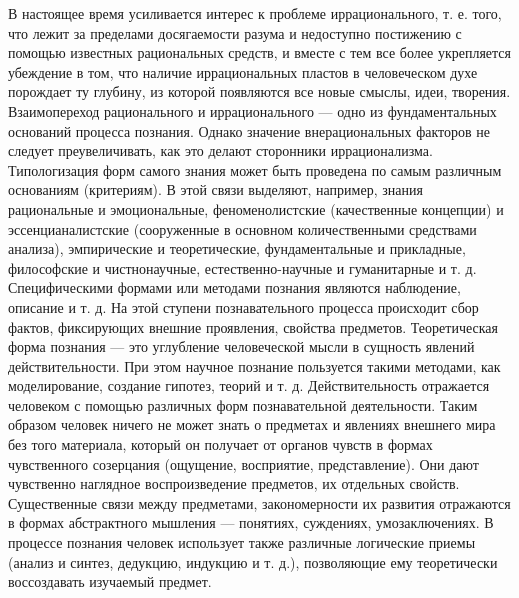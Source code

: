 \documentclass[12pt]{article}
\begin{document}
В  настоящее  время усиливается  интерес к  проблеме  иррационального, т. е.  того, что лежит  за  пределами
досягаемости разума и недоступно постижению с помощью известных рациональных средств, и вместе с тем
все более укрепляется убеждение в том, что наличие иррациональных пластов в человеческом духе порождает
ту  глубину,  из  которой  появляются  все  новые  смыслы,  идеи,  творения.  Взаимопереход  рационального  и
иррационального --- одно из фундаментальных оснований процесса познания. Однако значение внерациональных
факторов не следует преувеличивать, как это делают сторонники иррационализма.
Типологизация форм самого знания может быть проведена по самым различным основаниям (критериям). В
этой связи выделяют,  например,  знания рациональные и  эмоциональные, феноменолистские  (качественные
концепции)  и  эссенцианалистские  (сооруженные  в  основном  количественными  средствами  анализа),
эмпирические и теоретические, фундаментальные и прикладные, философские и чистнонаучные, естественно-научные и гуманитарные и т. д.
Специфическими формами или методами познания являются наблюдение, описание и т. д. На этой ступени
познавательного процесса происходит сбор фактов, фиксирующих внешние проявления, свойства предметов.
Теоретическая форма познания --- это углубление человеческой мысли в сущность явлений действительности.
При этом научное познание пользуется такими методами, как моделирование, создание гипотез, теорий и т. д.
Действительность отражается человеком с помощью различных форм познавательной деятельности.
Таким образом человек ничего не может знать о предметах и явлениях внешнего мира без того материала,
который  он  получает  от  органов  чувств  в  формах  чувственного  созерцания  (ощущение,  восприятие,
представление).  Они  дают  чувственно  наглядное  воспроизведение  предметов,  их  отдельных  свойств.
Существенные  связи  между  предметами,  закономерности  их  развития  отражаются  в  формах  абстрактного
мышления --- понятиях, суждениях, умозаключениях. В процессе познания человек использует также различные
логические приемы (анализ и синтез, дедукцию, индукцию и т. д.), позволяющие ему теоретически воссоздавать
изучаемый предмет.

\newpage
\end{document}
